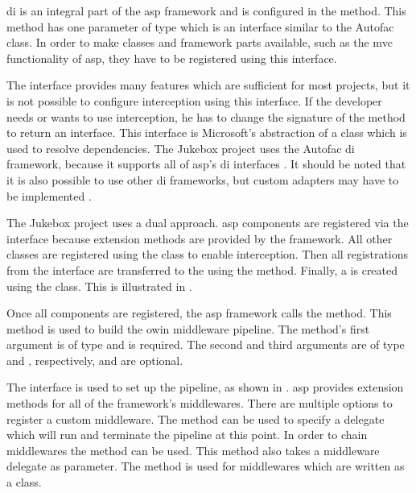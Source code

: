 \gls{di} is an integral part of the \gls{asp} framework and is configured in the  method. This method has one parameter of type  which is an interface similar to the Autofac  class. In order to make classes and framework parts available, such as the \gls{mvc} functionality of \gls{asp}, they have to be registered using this interface.

The  interface provides many features which are sufficient for most projects, but it is not possible to configure interception using this interface. If the developer needs or wants to use interception, he has to change the signature of the  method to return an  interface. This interface is Microsoft's abstraction of a  class which is used to resolve dependencies. The Jukebox project uses the Autofac \gls{di} framework, because it supports all of \gls{asp}'s \gls{di} interfaces \cite{autofacCoreDoc}. It should be noted that it is also possible to use other \gls{di} frameworks, but custom adapters may have to be implemented \cite{aspCustomDI}.

The Jukebox project uses a dual approach. \gls{asp} components are registered via the  interface because extension methods are provided by the framework. All other classes are registered using the  class to enable interception. Then all registrations from the  interface are transferred to the  using the  method. Finally, a  is created using the   class. This is illustrated in .


Once all components are registered, the \gls{asp} framework calls the  method. This method is used to build the \gls{owin} middleware pipeline. The method's first argument is of type  and is required. The second and third arguments are of type  and , respectively, and are optional.

The  interface is used to set up the pipeline, as shown in . \gls{asp} provides extension methods for all of the framework's middlewares. There are multiple options to register a custom middleware. The  method can be used to specify a delegate which will run and terminate the pipeline at this point. In order to chain middlewares the  method can be used. This method also takes a middleware delegate as parameter. The  method is used for middlewares which are written as a class. \cite{aspMiddleware}

